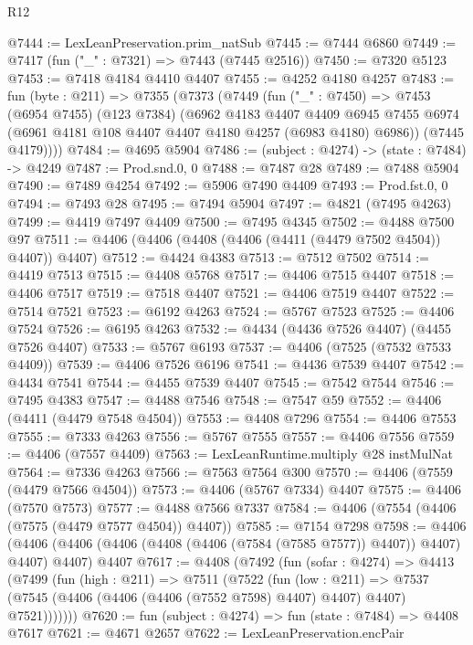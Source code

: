 \begin{lexlean}{R12}
\begin{coremodule}
@7444 := LexLeanPreservation.prim_natSub
@7445 := @7444 @6860
@7449 := @7417 (fun ("_" : @7321) => @7443 (@7445 @2516))
@7450 := @7320 @5123
@7453 := @7418 @4184 @4410 @4407
@7455 := @4252 @4180 @4257
@7483 := fun (byte : @211) =>
  @7355
    (@7373
      (@7449
        (fun ("_" : @7450) =>
        @7453
          (@6954 @7455)
          (@123 @7384)
          (@6962
            @4183
            @4407
            @4409
            @6945
            @7455
            @6974
            (@6961 @4181 @108 @4407 @4407 @4180 @4257 (@6983 @4180) @6986))
          (@7445 @4179))))
@7484 := @4695 @5904
@7486 := (subject : @4274) -> (state : @7484) -> @4249
@7487 := Prod.snd.{0, 0}
@7488 := @7487 @28
@7489 := @7488 @5904
@7490 := @7489 @4254
@7492 := @5906 @7490 @4409
@7493 := Prod.fst.{0, 0}
@7494 := @7493 @28
@7495 := @7494 @5904
@7497 := @4821 (@7495 @4263)
@7499 := @4419 @7497 @4409
@7500 := @7495 @4345
@7502 := @4488 @7500 @97
@7511 := @4406 (@4406 (@4408 (@4406 (@4411 (@4479 @7502 @4504)) @4407)) @4407)
@7512 := @4424 @4383
@7513 := @7512 @7502
@7514 := @4419 @7513
@7515 := @4408 @5768
@7517 := @4406 @7515 @4407
@7518 := @4406 @7517
@7519 := @7518 @4407
@7521 := @4406 @7519 @4407
@7522 := @7514 @7521
@7523 := @6192 @4263
@7524 := @5767 @7523
@7525 := @4406 @7524
@7526 := @6195 @4263
@7532 := @4434 (@4436 @7526 @4407) (@4455 @7526 @4407)
@7533 := @5767 @6193
@7537 := @4406 (@7525 (@7532 @7533 @4409))
@7539 := @4406 @7526 @6196
@7541 := @4436 @7539 @4407
@7542 := @4434 @7541
@7544 := @4455 @7539 @4407
@7545 := @7542 @7544
@7546 := @7495 @4383
@7547 := @4488 @7546
@7548 := @7547 @59
@7552 := @4406 (@4411 (@4479 @7548 @4504))
@7553 := @4408 @7296
@7554 := @4406 @7553
@7555 := @7333 @4263
@7556 := @5767 @7555
@7557 := @4406 @7556
@7559 := @4406 (@7557 @4409)
@7563 := LexLeanRuntime.multiply @28 instMulNat
@7564 := @7336 @4263
@7566 := @7563 @7564 @300
@7570 := @4406 (@7559 (@4479 @7566 @4504))
@7573 := @4406 (@5767 @7334) @4407
@7575 := @4406 (@7570 @7573)
@7577 := @4488 @7566 @7337
@7584 := @4406 (@7554 (@4406 (@7575 (@4479 @7577 @4504)) @4407))
@7585 := @7154 @7298
@7598 := @4406
    (@4406 (@4406 (@4406 (@4408 (@4406 (@7584 (@7585 @7577)) @4407)) @4407) @4407) @4407)
    @4407
@7617 := @4408
    (@7492
      (fun (sofar : @4274) =>
      @4413
        (@7499
          (fun (high : @211) =>
          @7511
            (@7522
              (fun (low : @211) =>
              @7537 (@7545 (@4406 (@4406 (@4406 (@7552 @7598) @4407) @4407) @4407) @7521)))))))
@7620 := fun (subject : @4274) => fun (state : @7484) => @4408 @7617
@7621 := @4671 @2657
@7622 := LexLeanPreservation.encPair

\end{coremodule}
\end{lexlean}

